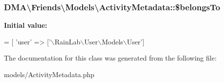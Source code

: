 \subsubsection[{\$belongs\+To}]{\setlength{\rightskip}{0pt plus 5cm}D\+M\+A\textbackslash{}\+Friends\textbackslash{}\+Models\textbackslash{}\+Activity\+Metadata\+::\$belongs\+To}\label{classDMA_1_1Friends_1_1Models_1_1ActivityMetadata_a41b080a3ea1f2019d7695e7825b449fe}
{\bfseries Initial value\+:}
\begin{DoxyCode}
= [
        \textcolor{stringliteral}{'user'}      => [\textcolor{stringliteral}{'\(\backslash\)RainLab\(\backslash\)User\(\backslash\)Models\(\backslash\)User'}]
\end{DoxyCode}


The documentation for this class was generated from the following file\+:\begin{DoxyCompactItemize}
\item 
models/Activity\+Metadata.\+php\end{DoxyCompactItemize}

